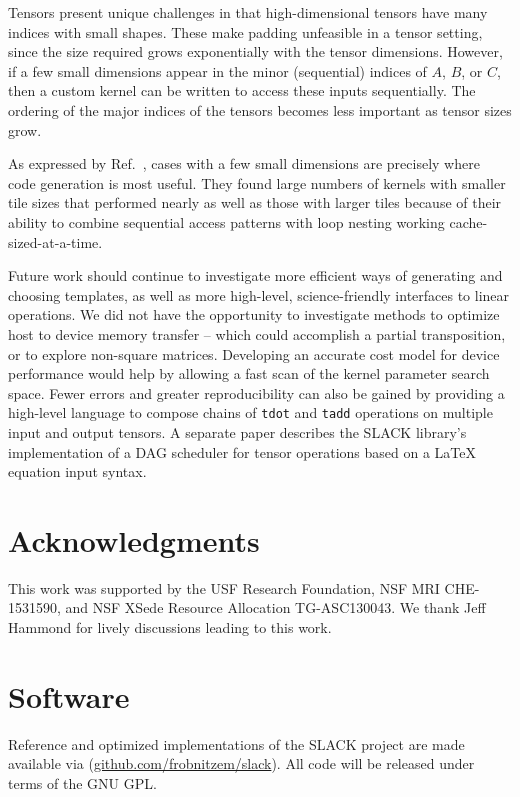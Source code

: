 \documentclass{sigplanconf}
\begin{document}
  Tensors present unique challenges in that high-dimensional tensors
have many indices with small shapes.
These make padding unfeasible in a tensor setting,
since the size required grows exponentially
with the tensor dimensions.
However, if a few small dimensions appear in the minor (sequential)
indices of $A$, $B$, or $C$, then a custom kernel
can be written to access these inputs sequentially.
The ordering of the major indices of the
tensors becomes less important as tensor sizes grow.

  As expressed by Ref.~\cite{magma}, cases with a few small
dimensions are precisely where code generation
is most useful.
They found large numbers of kernels with smaller tile sizes
that performed nearly as well as those with larger tiles
because of their ability to combine sequential access patterns
with loop nesting working cache-sized-at-a-time.

  Future work should continue to investigate more efficient
ways of generating and choosing templates, as well as
more high-level, science-friendly interfaces to linear operations.
We did not have the opportunity to investigate methods to
optimize host to device memory transfer -- which could accomplish a
partial transposition, or to explore non-square matrices.
Developing an accurate cost model for device
performance would help by allowing a fast scan of the kernel
parameter search space.
Fewer errors and greater reproducibility can also be
gained by providing a high-level language to compose
chains of {\tt tdot} and {\tt tadd}
operations on multiple input and output tensors.
A separate paper describes the SLACK library's implementation of a
DAG scheduler for tensor operations
based on a \LaTeX{} equation input syntax.

\section{ Acknowledgments}
  This work was supported by the USF Research Foundation,
NSF MRI CHE-1531590, and NSF XSede Resource Allocation TG-ASC130043.
We thank Jeff Hammond for lively discussions leading to this work.

\section{ Software}
  Reference and optimized implementations of the SLACK project
are made available via
(\href{https://github.com/frobnitzem/slack}{github.com/frobnitzem/slack}).
All code will be released under terms of the GNU GPL.




\end{document}

